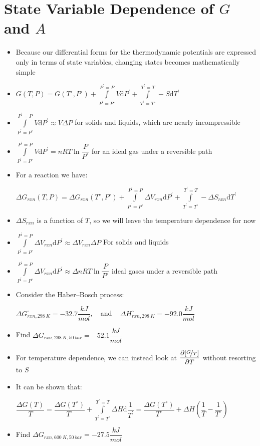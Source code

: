 \documentclass[12pt, openany, letterpaper]{memoir}
\begin{document}
\section*{State Variable Dependence of $G$ and $A$}
\begin{itemize}
	\item Because our differential forms for the thermodynamic potentials are expressed only in terms of state variables, changing states becomes mathematically simple
	\item $G(T,P) = G(T^\circ,P^\circ) + \int\limits_{P^\prime=P^\circ}^{P^\prime=P}\!V\mathrm{d}P^\prime + \int\limits_{T^\prime=T^\circ}^{T^\prime=T}\! -S\mathrm{d}T^\prime$	
	\item $\int\limits_{P^\prime=P^\circ}^{P^\prime=P}\!V\mathrm{d}P^\prime \approx V\Delta P$ for solids and liquids, which are nearly incompressible
	\item $\int\limits_{P^\prime=P^\circ}^{P^\prime=P}\!V\mathrm{d}P^\prime = nRT\ln\dfrac{P}{P^\circ}$ for an ideal gas under a reversible path
	\item For a reaction we have:
	
	$\Delta G_{rxn}(T,P) = \Delta G_{rxn}(T^\circ,P^\circ) + \int\limits_{P^\prime=P^\circ}^{P^\prime=P}\!\Delta V_{rxn}\mathrm{d}P^\prime + \int\limits_{T^\prime=T^\circ}^{T^\prime=T}\! -\Delta S_{rxn}\mathrm{d}T^\prime$
	\item $\Delta S_{rxn}$ is a function of $T$, so we will leave the temperature dependence for now
	\item $\int\limits_{P^\prime=P^\circ}^{P^\prime=P}\!\Delta V_{rxn}\mathrm{d}P^\prime \approx \Delta V_{rxn}\Delta P$ For solids and liquids	
	\item $\int\limits_{P^\prime=P^\circ}^{P^\prime=P}\!\Delta V_{rxn}\mathrm{d}P^\prime \approx \Delta nRT\ln\dfrac{P}{P^\circ}$ ideal gases under a reversible path
	\item Consider the Haber–Bosch process:  
	
	$\Delta G_{rxn,298~K}^\circ = -32.7 \dfrac{kJ}{mol}$, ~ and ~ $\Delta H_{rxn,298~K}^\circ = -92.0 \dfrac{kJ}{mol}$
	\item Find $\Delta G_{rxn,298~K, 50~bar} = -52.1 \dfrac{kJ}{mol}$	
	\item For temperature dependence, we can instead look at $\dfrac{\partial [\nicefrac{G}{T}]}{\partial T}$ without resorting to $S$
	\item It can be shown that: 
	
	$\dfrac{\Delta G(T)}{T} = \dfrac{\Delta G(T^\circ)}{T^\circ}+\int\limits_{T^\prime=T^\circ}^{T^\prime=T}\!\Delta H\mathrm{d}\dfrac{1}{T^\prime} = \dfrac{\Delta G(T^\circ)}{T^\circ}+\Delta H\left(\dfrac{1}{T}-\dfrac{1}{T^\circ}\right)$
	\item Find $\Delta G_{rxn,600~K, 50~bar} = -27.5 \dfrac{kJ}{mol}$
\end{itemize}
\end{document}
